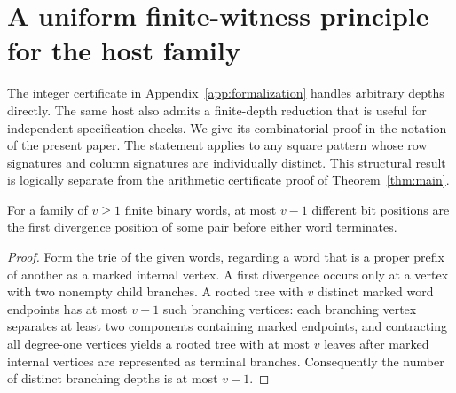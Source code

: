 \section{A uniform finite-witness principle for the host family}
\label{app:smallwitness}
The integer certificate in Appendix~\ref{app:formalization} handles
arbitrary depths directly. The same host also admits a finite-depth
reduction that is useful for independent specification checks.
We give its combinatorial proof in the notation of the present paper.
The statement applies to any square pattern whose row signatures and
column signatures are individually distinct. This structural result
is logically separate from the arithmetic certificate proof of
Theorem~\ref{thm:main}.

\begin{lemma}\label{lem:branchlevels}
For a family of $v\ge1$ finite binary words, at most $v-1$ different
bit positions are the first divergence position of some pair before
either word terminates.
\end{lemma}
\begin{proof}
Form the trie of the given words, regarding a word that is a proper
prefix of another as a marked internal vertex. A first divergence
occurs only at a vertex with two nonempty child branches. A rooted
tree with $v$ distinct marked word endpoints has at most $v-1$ such
branching vertices: each branching vertex separates at least two
components containing marked endpoints, and contracting all degree-one
vertices yields a rooted tree with at most $v$ leaves after marked
internal vertices are represented as terminal branches. Consequently
the number of distinct branching depths is at most $v-1$.
\end{proof}

